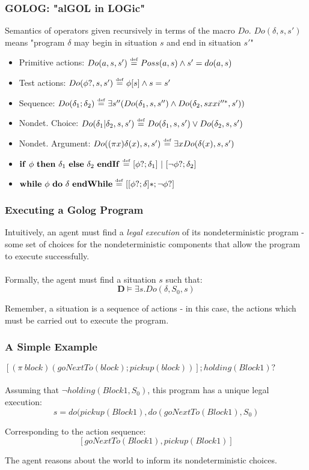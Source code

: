 \documentclass{beamer}
\newcommand{\isdef}{\hbox{$\stackrel{\mbox{\tiny def}}{=}$}}
\begin{document}
\begin{frame}
\frametitle{GOLOG: "alGOL in LOGic"}
Semantics of operators given recursively in terms of the macro $Do$.
$Do(\delta,s,s')$ means "program $\delta$ may begin in situation $s$ and end
in situation $s'$"
\begin{itemize}
  \pause
  \item Primitive actions: $Do(a,s,s')\ \isdef\ Poss(a,s)\wedge s'=do(a,s)$
  \pause
  \item Test actions: $Do(\phi?,s,s')\ \isdef\ \phi [s] \wedge s=s'$
  \pause
  \item Sequence: $Do(\delta_1;\delta_2)\ \isdef\ \exists s'' (Do(\delta_1,s,s'')\wedge Do(\delta_2,sxxi''^*,s'))$
  \pause
  \item Nondet. Choice: $Do(\delta_1|\delta_2,s,s')\ \isdef\ Do(\delta_1,s,s')\vee Do(\delta_2,s,s')$
  \pause
  \item Nondet. Argument: $Do((\pi x)\delta(x),s,s')\ \isdef\ \exists x Do(\delta(x),s,s')$
  \pause
  \item $\mathbf{if}\ \phi\ \mathbf{then}\ \delta_1\ \mathbf{else}\ \delta_2\ \mathbf{endIf}\ \isdef\ [\phi?;\delta_1]\ |\ [\neg\phi?;\delta_2]$
  \pause
  \item $\mathbf{while}\ \phi\ \mathbf{do}\ \delta\ \mathbf{endWhile}\ \isdef\ [[\phi?;\delta]*;\neg\phi?]$
\end{itemize}
\end{frame}

\begin{frame}
\frametitle{Executing a Golog Program}
Intuitively, an agent must find a \emph{legal execution} of its nondeterministic
program - some set of choices for the nondeterministic components that allow
the program to execute successfully.\\
\ \\
Formally, the agent must find a situation $s$ such that:\[
\mathbf{D} \models \exists s . Do(\delta,S_0,s)\]


Remember, a situation is a sequence of actions - in this case, the actions which must be carried out to execute the program.
\end{frame}

\begin{frame}
\frametitle{A Simple Example}
$[(\pi\ block)(goNextTo(block);pickup(block))];holding(Block1)?$\\
\ \\
Assuming that $\neg holding(Block1,S_0)$, this program has a unique
legal execution:\[
s = do(pickup(Block1),do(goNextTo(Block1),S_0)\]

Corresponding to the action sequence:\[
[goNextTo(Block1), pickup(Block1)]\]

The agent reasons about the world to inform its nondeterministic choices.
\end{frame}
\end{document}
